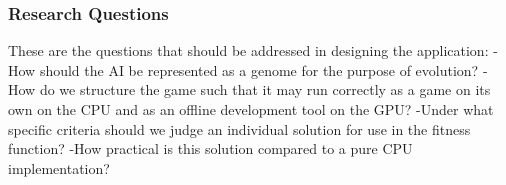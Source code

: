 \subsubsection*{Research Questions}
These are the questions that should be addressed in designing the application:
-How should the AI be represented as a genome for the purpose of evolution?
-How do we structure the game such that it may run correctly as a game on its own
on the CPU and as an offline development tool on the GPU?
-Under what specific criteria should we judge an individual solution for use in the
fitness function?
-How practical is this solution compared to a pure CPU implementation?